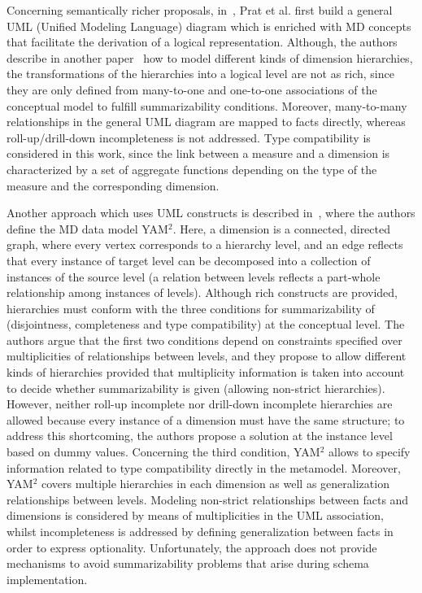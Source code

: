 Concerning semantically richer proposals,
in~\cite{DBLP:journals/dss/PratAC06}, Prat et al. first build a
general UML (Unified Modeling Language) diagram which is enriched
with MD concepts that facilitate the derivation of a logical
representation. Although, the authors describe in another
paper~\cite{DBLP:conf/er/AkokaCP01} how to model different kinds of
dimension hierarchies, the transformations of the hierarchies into a
logical level are not as rich, since they are only defined from
many-to-one and one-to-one associations of the conceptual model to
fulfill summarizability conditions. Moreover, many-to-many
relationships in the general UML diagram are mapped to facts
directly, whereas roll-up/drill-down incompleteness is not
addressed. Type compatibility is considered in this work, since the
link between a measure and a dimension is characterized by a set of
aggregate functions depending on the type of the measure and the
corresponding dimension.

Another approach which uses UML constructs is described
in~\cite{DBLP:journals/is/AbelloSS06}, where the authors define the
MD data model YAM$^{\mbox{2}}$.  Here, a dimension is a connected,
directed graph, where every vertex corresponds to a hierarchy level,
and an edge reflects that every instance of target level can be
decomposed into a collection of instances of the source level (a
relation between levels reflects a part-whole relationship among
instances of levels). Although rich constructs are provided,
hierarchies must conform with the three conditions for
summarizability of \cite{DBLP:conf/ssdbm/LenzS97} (disjointness,
completeness and type compatibility) at the conceptual level. The
authors argue that the first two conditions depend on constraints
specified over multiplicities of relationships between levels, and
they propose to allow different kinds of hierarchies provided that
multiplicity information is taken into account to decide whether
summarizability is given (allowing non-strict hierarchies). However,
neither roll-up incomplete nor drill-down incomplete hierarchies are
allowed because every instance of a dimension must have the same
structure; to address this shortcoming, the authors propose a
solution at the instance level based on dummy values. Concerning the
third condition, YAM$^{\mbox{2}}$ allows to specify information
related to type compatibility directly in the metamodel. Moreover,
YAM$^{\mbox{2}}$ covers multiple hierarchies in each dimension as
well as generalization relationships between levels. Modeling
non-strict relationships between facts and dimensions is considered
by means of multiplicities in the UML association, whilst
incompleteness is addressed by defining generalization between facts
in order to express optionality. Unfortunately, the approach does
not provide mechanisms to avoid summarizability problems that arise
during schema implementation.


